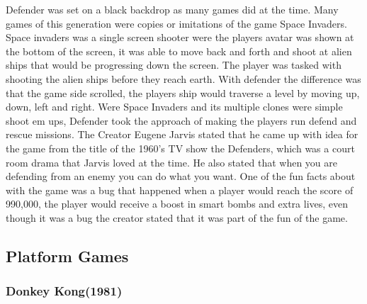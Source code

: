 \documentclass{article}
\begin{document}
Defender was set on a black backdrop as many games did at the time. Many games of this generation were copies or imitations of the game Space Invaders. Space invaders was a single screen shooter were the players avatar was shown at the bottom of the screen, it was able to move back and forth and shoot at alien ships that would be progressing down the screen. The player was tasked with shooting the alien ships before they reach earth. With defender the difference was that the game side scrolled, the players ship would traverse a level by moving up, down, left and right. Were Space Invaders and its multiple clones were simple shoot em ups, Defender took the approach of making the players run defend and rescue missions. The Creator Eugene Jarvis stated that he came up with idea for the game from the title of the 1960's TV show the Defenders, which was a court room drama that Jarvis loved at the time. He also stated that when you are defending from an enemy you can do what you want. One of the fun facts about with the game was a bug that happened when a player would reach the score of 990,000, the player would receive a boost in smart bombs and extra lives, even though it was a bug the creator stated that it was part of the fun of the game.

\clearpage

			
\subsection{Platform Games}

\subsubsection{Donkey Kong(1981)}
\end{document}
